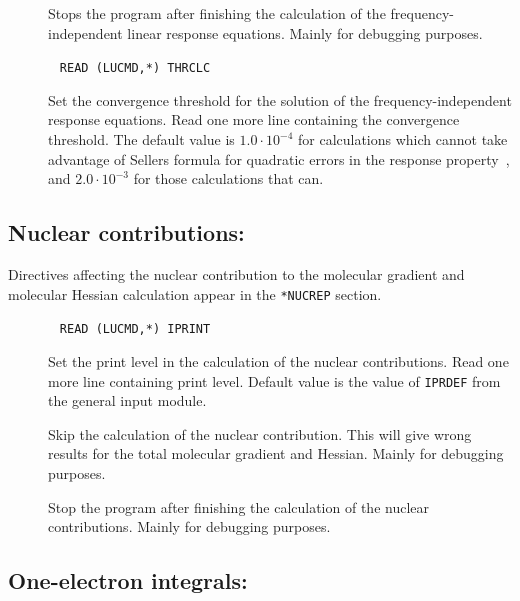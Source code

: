 \begin{description}
\item[] Stops the program after finishing the
calculation of the frequency-independent linear response equations. Mainly
for debugging purposes. 

\item[]\verb| |\newline
\verb|READ (LUCMD,*) THRCLC|

Set the convergence threshold for the solution
of the frequency-independent response equations. Read one more line
containing the convergence threshold. The default value is
$1.0\cdot10^{-4}$ for calculations which cannot take advantage of Sellers
formula for quadratic errors in the response
property~\cite{hsijqc30}, and $2.0\cdot10^{-3}$ for those calculations
that can.
\end{description}

\subsection{Nuclear contributions: }

Directives affecting the nuclear contribution to the molecular
gradient and molecular Hessian
calculation appear in the 
\verb|*NUCREP| section.
\begin{description}
\item[]\verb| |\newline
\verb|READ (LUCMD,*) IPRINT|

Set the print level in the calculation of the nuclear contributions.
Read one more line containing print level. Default value is the
value of \verb|IPRDEF| from the general input module.

\item[] Skip the calculation of the nuclear
contribution. This will give wrong
results for the total molecular gradient and Hessian. Mainly for
debugging purposes. 

\item[] Stop the program after finishing the calculation
of the nuclear contributions. Mainly for debugging purposes.
\end{description}

\subsection{One-electron integrals: }


